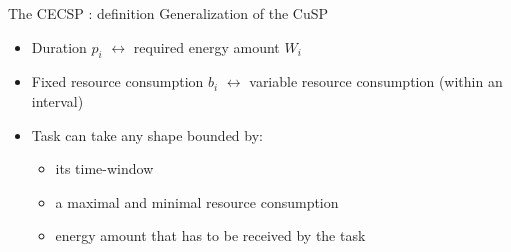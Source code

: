 \begin{frame}{The CECSP : definition }
   Generalization of the CuSP
   \begin{itemize}
     \vfill
\pause
   \item Duration $p_i$ $\leftrightarrow$ required energy amount $W_i$
     \vfill
\pause
   \item Fixed resource consumption $b_i$ $\leftrightarrow$ variable resource consumption (within an interval)
     \vfill  
\pause
   \item Task can take any shape bounded by:
     \begin{itemize}
     \item<5-> its time-window
     \item<6-> a maximal and minimal resource consumption
     \item<7-> energy amount that has to be received by the task
     \end{itemize}
     \vfill
   \end{itemize}
   \begin{overlayarea}{\textwidth}{3cm}
      {
       \vfill
       \begin{columns}
         \begin{column}{0.45\linewidth}
           
         \end{column}
         \begin{column}{0.45\linewidth}
           
         \end{column}
       \end{columns}
       \vfill}
   \end{overlayarea}
 \end{frame}
 
